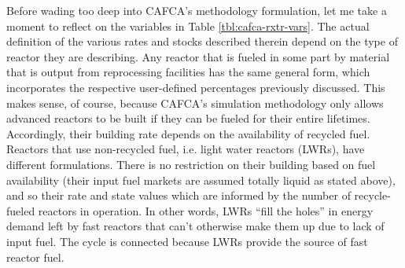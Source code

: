 Before wading too deep into CAFCA's methodology formulation, let me take a
moment to reflect on the variables in Table \ref{tbl:cafca-rxtr-vars}. The
actual definition of the various rates and stocks described therein depend on
the type of reactor they are describing. Any reactor that is fueled in some part
by material that is output from reprocessing facilities has the same general
form, which incorporates the respective user-defined percentages previously
discussed. This makes sense, of course, because CAFCA's simulation methodology
only allows advanced reactors to be built if they can be fueled for their entire
lifetimes. Accordingly, their building rate depends on the availability of
recycled fuel. Reactors that use non-recycled fuel, i.e. light water reactors
(LWRs), have different formulations. There is no restriction on their building
based on fuel availability (their input fuel markets are assumed totally liquid
as stated above), and so their rate and state values which are informed by the
number of recycle-fueled reactors in operation. In other words, LWRs ``fill the
holes'' in energy demand left by fast reactors that can't otherwise make them up
due to lack of input fuel. The cycle is connected because LWRs provide the
source of fast reactor fuel.

